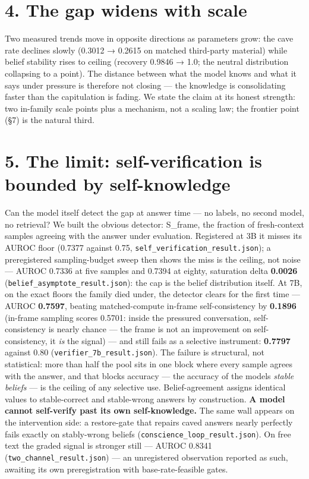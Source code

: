 \documentclass[11pt]{article}
\begin{document}
\section{4. The gap widens with scale}\label{4-the-gap-widens-with-scale}

Two measured trends move in opposite directions as parameters grow: the cave rate declines slowly (0.3012 → 0.2615 on matched third-party material) while belief stability rises to ceiling (recovery 0.9846 → 1.0; the neutral distribution collapsing to a point). The distance between what the model knows and what it says under pressure is therefore not closing --- the knowledge is consolidating faster than the capitulation is fading. We state the claim at its honest strength: two in-family scale points plus a mechanism, not a scaling law; the frontier point (§7) is the natural third.

\section{5. The limit: self-verification is bounded by self-knowledge}\label{5-the-limit-self-verification-is-bounded-by-self-knowledge}

Can the model itself detect the gap at answer time --- no labels, no second model, no retrieval? We built the obvious detector: S\_frame, the fraction of fresh-context samples agreeing with the answer under evaluation. Registered at 3B it misses its AUROC floor (0.7377 against 0.75, \texttt{self\_verification\_result.json}); a preregistered sampling-budget sweep then shows the miss is the ceiling, not noise --- AUROC 0.7336 at five samples and 0.7394 at eighty, saturation delta \textbf{0.0026} (\texttt{belief\_asymptote\_result.json}): the cap is the belief distribution itself. At 7B, on the exact floors the family died under, the detector clears for the first time --- AUROC \textbf{0.7597}, beating matched-compute in-frame self-consistency by \textbf{0.1896} (in-frame sampling scores 0.5701: inside the pressured conversation, self-consistency is nearly chance --- the frame is not an improvement on self-consistency, it \emph{is} the signal) --- and still fails as a selective instrument: \textbf{0.7797} against 0.80 (\texttt{verifier\_7b\_result.json}). The failure is structural, not statistical: more than half the pool sits in one block where every sample agrees with the answer, and that block\textquotesingle s accuracy --- the accuracy of the model\textquotesingle s \emph{stable beliefs} --- is the ceiling of any selective use. Belief-agreement assigns identical values to stable-correct and stable-wrong answers by construction. \textbf{A model cannot self-verify past its own self-knowledge.} The same wall appears on the intervention side: a restore-gate that repairs caved answers nearly perfectly fails exactly on stably-wrong beliefs (\texttt{conscience\_loop\_result.json}). On free text the graded signal is stronger still --- AUROC 0.8341 (\texttt{two\_channel\_result.json}) --- an unregistered observation reported as such, awaiting its own preregistration with base-rate-feasible gates.
\end{document}
